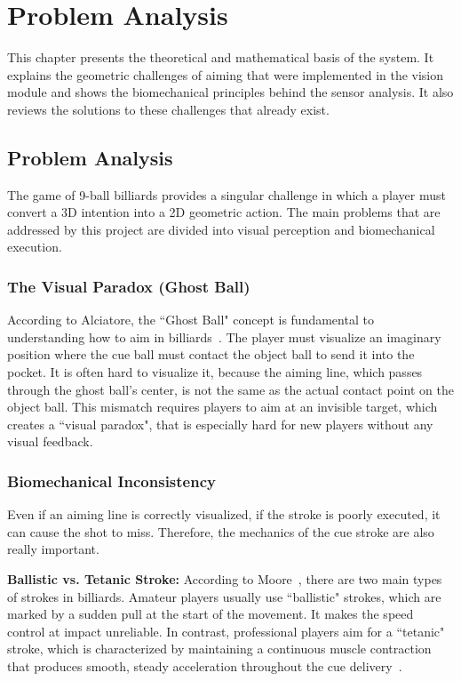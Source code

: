 \chapter{Problem Analysis}

This chapter presents the theoretical and mathematical basis of the system. It explains the geometric challenges of aiming that were implemented in the vision module and shows the biomechanical principles behind the sensor analysis. It also reviews the solutions to these challenges that already exist.
\section{Problem Analysis}

The game of 9-ball billiards provides a singular challenge in which a player must convert a 3D intention into a 2D geometric action. The main problems that are addressed by this project are divided into visual perception and biomechanical execution.

\subsection{The Visual Paradox (Ghost Ball)}
According to Alciatore, the ``Ghost Ball" concept is fundamental to understanding how to aim in billiards~\cite{bib:ghost-ball}. The player must visualize an imaginary position where the cue ball must contact the object ball to send it into the pocket. It is often hard to visualize it, because the aiming line, which passes through the ghost ball's center, is not the same as the actual contact point on the object ball. This mismatch requires players to aim at an invisible target, which creates a ``visual paradox", that is especially hard for new players without any visual feedback. 

\subsection{Biomechanical Inconsistency}
Even if an aiming line is correctly visualized, if the stroke is poorly executed, it can cause the shot to miss. Therefore, the mechanics of the cue stroke are also really important. 

\textbf{Ballistic vs. Tetanic Stroke:}
According to Moore~\cite{bib:moore}, there are two main types of strokes in billiards. Amateur players usually use ``ballistic" strokes, which are marked by a sudden pull at the start of the movement. It makes the speed control at impact unreliable. In contrast, professional players aim for a ``tetanic" stroke, which is characterized by maintaining a continuous muscle contraction that produces smooth, steady acceleration throughout the cue delivery~\cite{bib:moore}.

